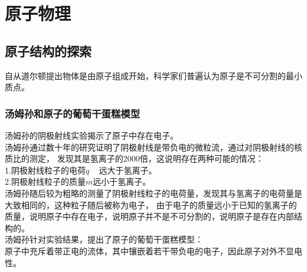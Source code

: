 \documentclass[UTF8]{ctexart}
\begin{document}
\newpage

\section{原子物理}

\subsection{原子结构的探索}
    自从道尔顿提出物体是由原子组成开始，科学家们普遍认为原子是不可分割的最小质点。\vspace{5pt}

\subsubsection{汤姆孙和原子的葡萄干蛋糕模型}
    汤姆孙的阴极射线实验揭示了原子中存在电子。\\[3mm]
    汤姆孙通过数十年的研究证明了阴极射线是带负电的微粒流，通过对阴极射线的核质比的测定，
    发现其是氢离子的2000倍，这说明存在两种可能的情况：\\[3mm]
    1.阴极射线粒子的电荷$q$~~\,远大于氢离子。\\[3mm]
    2.阴极射线粒子的质量$m$远小于氢离子。\\[3mm]
    汤姆孙随后较为粗略的测量了阴极射线粒子的电荷量，发现其与氢离子的电荷量是大致相同的，这种粒子随后被称为电子，
    由于电子的质量远小于已知的氢离子的质量，说明原子中存在电子，说明原子并不是不可分割的，说明原子是存在内部结构的。\\[3mm]
    汤姆孙针对实验结果，提出了原子的葡萄干蛋糕模型：\\[3mm]
    原子中充斥着带正电的流体，其中镶嵌着若干带负电的电子，因此原子对外不显电性。\\
\end{document}
